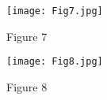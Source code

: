 \begin{figure}[h!]
	\begin{center}
		\texttt{[image: Fig7.jpg]}
		\caption{Figure 7}
		\label{fig:7}
	\end{center}
\end{figure}

\begin{figure}[h!]
	\begin{center}
		\texttt{[image: Fig8.jpg]}
		\caption{Figure 8}
		\label{fig:8}
	\end{center}
\end{figure}
